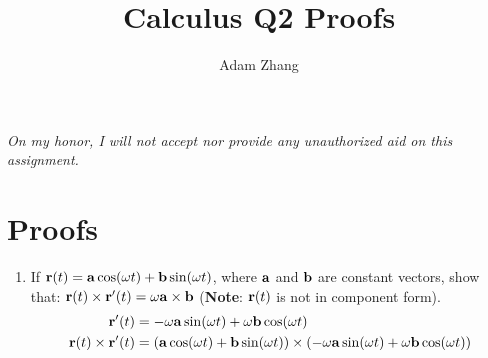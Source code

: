 \documentclass[11pt]{article}
\title{Calculus Q2 Proofs}
\author{Adam Zhang}
\renewcommand{\vec}[1]{\ensuremath\mathbf{#1}}
\begin{document}
\pagestyle{fancy}

\begin{center}
  \emph{On my honor, I will not accept nor provide any unauthorized aid on this assignment.}
\end{center}

\section*{Proofs}
\begin{enumerate}
\item If \(\vec{r}(t) = \vec{a}\cos(\omega t) + \vec{b}\sin(\omega t)\), where \(\vec{a}\) and \(\vec{b}\) are constant vectors, show that: \(\vec{r}(t) \times \vec{r} '(t) = \omega \vec{a} \times \vec{b}\) (\textbf{Note}: \(\vec{r}(t)\) is not in component form).
  \begin{align*}
    \vec{r}'(t) &= -\omega \vec{a}\sin(\omega t) + \omega \vec{b} \cos (\omega t) \\
    \vec{r}(t) \times \vec{r}'(t) &= \left( \vec{a} \cos(\omega t) + \vec{b} \sin(\omega t) \right) \times \left( -\omega \vec{a} \sin(\omega t) + \omega \vec{b} \cos(\omega t) \right) \\
  \end{align*}
\end{enumerate}
\end{document}
